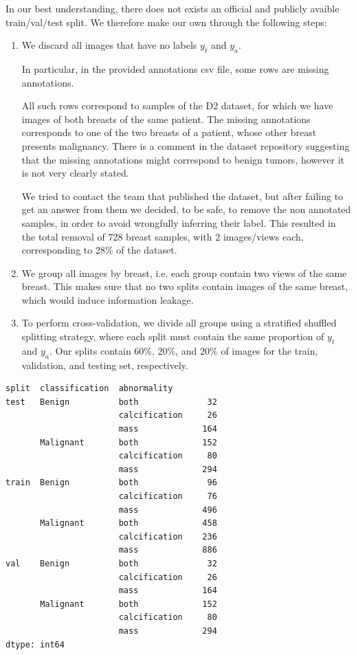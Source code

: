 \documentclass[11pt]{article}
\begin{document}
In our best understanding, there does not exists an official and publicly avaible train/val/test
split. We therefore make our own through the following steps:

\begin{enumerate}
\item We discard all images that have no labels \(y_t\) and \(y_a\).

In particular, in the provided annotations csv file, some rows are missing annotations.

All such rows correspond to samples of the D2 dataset, for which we have images of both
breasts of the same patient.
The missing annotations corresponds to one of the two breasts of a patient, whose other
breast presents malignancy.
There is a comment in the dataset repository suggesting that the missing annotations
might correspond to benign tumors, however it is not very clearly stated.

We tried to contact the team that published the dataset, but after failing to get an answer
from them we decided, to be safe, to remove the non annotated samples, in
order to avoid wrongfully inferring their label. This resulted in the total removal of
728 breast samples, with 2 images/views each, corresponding to  28\% of the dataset.

\item We group all images by breast, i.e. each group contain two views of the same breast.
This makes sure that no two splits contain images of the same breast, which would
induce information leakage.
\item To perform cross-validation, we divide all groups using a stratified
shuffled splitting strategy, where each split
must contain the same proportion of \(y_t\) and \(y_a\). Our splits contain \(60\%\),
 \(20\%\), and \(20\%\) of images for the train, validation, and testing set, respectively.
\end{enumerate}

\begin{verbatim}
split  classification  abnormality  
test   Benign          both              32
                       calcification     26
                       mass             164
       Malignant       both             152
                       calcification     80
                       mass             294
train  Benign          both              96
                       calcification     76
                       mass             496
       Malignant       both             458
                       calcification    236
                       mass             886
val    Benign          both              32
                       calcification     26
                       mass             164
       Malignant       both             152
                       calcification     80
                       mass             294
dtype: int64
\end{verbatim}
\end{document}
